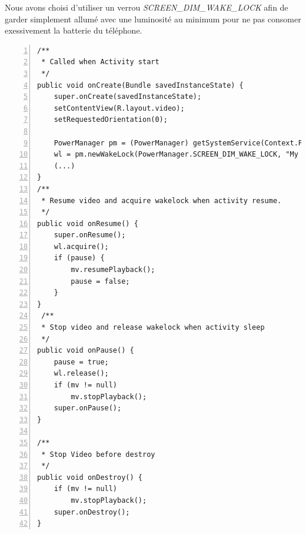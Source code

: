 Nous avons choisi d'utiliser un verrou \textit{SCREEN\_DIM\_WAKE\_LOCK} afin de
garder simplement allumé avec une luminosité au minimum pour ne pas consomer
exessivement la batterie du téléphone.
\newpage
 \begin{lstlisting}[caption={Video
life-cycle},  framexleftmargin=7mm, numbers=left] 
/**
 * Called when Activity start
 */
public void onCreate(Bundle savedInstanceState) {
	super.onCreate(savedInstanceState);
	setContentView(R.layout.video);
	setRequestedOrientation(0);
	
	PowerManager pm = (PowerManager) getSystemService(Context.POWER_SERVICE);
	wl = pm.newWakeLock(PowerManager.SCREEN_DIM_WAKE_LOCK, "My Tags");
	(...)
}
/**
 * Resume video and acquire wakelock when activity resume.
 */
public void onResume() {
	super.onResume();
	wl.acquire();
	if (pause) {
	    mv.resumePlayback();
	    pause = false;
	}
}
 /**
 * Stop video and release wakelock when activity sleep
 */
public void onPause() {
	pause = true;
	wl.release();
	if (mv != null)
	    mv.stopPlayback();
	super.onPause();
}

/**
 * Stop Video before destroy
 */
public void onDestroy() {
	if (mv != null)
	    mv.stopPlayback();
	super.onDestroy();
}
\end{lstlisting}

